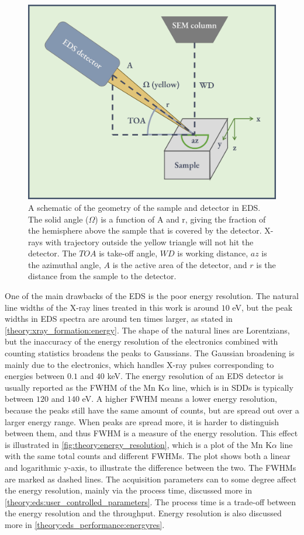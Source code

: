 \begin{figure}[ht]
    \centering
    \includegraphics[width=0.6\linewidth]{figures/EDS_geometry.png}
    \caption{
        A schematic of the geometry of the sample and detector in EDS.
        The solid angle ($\Omega$) is a function of A and r, giving the fraction of the hemisphere above the sample that is covered by the detector.
        X-rays with trajectory outside the yellow triangle will not hit the detector.
        The $TOA$ is take-off angle, $WD$ is working distance, $az$ is the azimuthal angle, $A$ is the active area of the detector, and $r$ is the distance from the sample to the detector.
    }
    \label{fig:eds_geometry}
\end{figure}






One of the main drawbacks of the EDS is the poor energy resolution. %
The natural line widths of the X-ray lines treated in this work is around $10$ eV, but the peak widths in EDS spectra are around ten times larger, as stated in \cref{theory:xray_formation:energy}.
The shape of the natural lines are Lorentzians, but the inaccuracy of the energy resolution of the electronics combined with counting statistics broadens the peaks to Gaussians.
The Gaussian broadening is mainly due to the electronics, which handles X-ray pulses corresponding to energies between $0.1$ and $40$ keV.
The energy resolution of an EDS detector is usually reported as the FWHM of the Mn K$\alpha$ line, which is in SDDs is typically between $120$ and $140$ eV.
A higher FWHM means a lower energy resolution, because the peaks still have the same amount of counts, but are spread out over a larger energy range.
When peaks are spread more, it is harder to distinguish between them, and thus FWHM is a measure of the energy resolution.
This effect is illustrated in \cref{fig:theory:energy_resolution}, which is a plot of the Mn K$\alpha$ line with the same total counts and different FWHMs.
The plot shows both a linear and logarithmic y-axis, to illustrate the difference between the two.
The FWHMs are marked as dashed lines.
The acquisition parameters can to some degree affect the energy resolution, mainly via the process time, discussed more in \cref{theory:eds:user_controlled_parameters}.
The process time is a trade-off between the energy resolution and the throughput.
Energy resolution is also discussed more in \cref{theory:eds_performance:energyres}.



